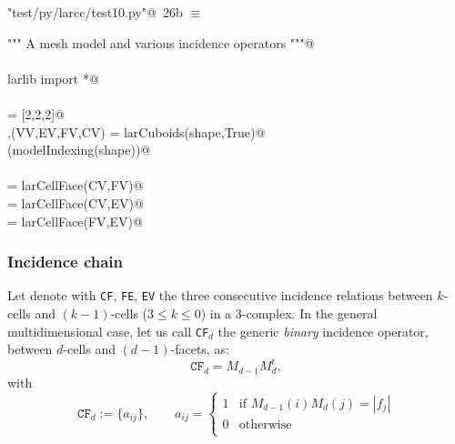 \documentclass[11pt,oneside]{article}    %
\begin{document}
\begin{flushleft} \small \label{scrap43}
\protect{}\verb@"test/py/larcc/test10.py"@\nobreak\ {\footnotesize 26b }$\equiv$
\vspace{-1ex}
\begin{list}{}{} \item
\mbox{}\verb@""" A mesh model and various incidence operators """@\\
\mbox{}\verb@@\\
\mbox{}\verb@from larlib import *@\\
\mbox{}\verb@@\\
\mbox{}\verb@shape = [2,2,2]@\\
\mbox{}\verb@V,(VV,EV,FV,CV) = larCuboids(shape,True)@\\
\mbox{}\verb@VIEW(modelIndexing(shape))@\\
\mbox{}\verb@@\\
\mbox{}\verb@CF = larCellFace(CV,FV)@\\
\mbox{}\verb@CE = larCellFace(CV,EV)@\\
\mbox{}\verb@FE = larCellFace(FV,EV)@\\
\mbox{}\verb@@{\NWsep}
\end{list}
\vspace{-2ex}
\end{flushleft}

\subsubsection{Incidence chain}

Let denote with \texttt{CF}, \texttt{FE}, \texttt{EV} the three consecutive incidence relations between $k$-cells and $(k-1)$-cells ($3\leq k\leq 0$) in a 3-complex. In the general multidimensional case, let us call \texttt{CF}$_d$  the generic \emph{binary} incidence operator, between $d$-cells and $(d-1)$-facets, as:
\[
\texttt{CF}_d = M_{d-1} M_d^t, 
\]
with
\[
\texttt{CF}_d := \{a_{ij}\}, \qquad a_{ij} = 
\left\{
\begin{array}{cl}
1 & \mbox{if\ } M_{d-1}(i) M_d(j) = |f_j|  \\
0 & \mbox{otherwise}  \\  
\end{array}
\right.
\]
\end{document}
